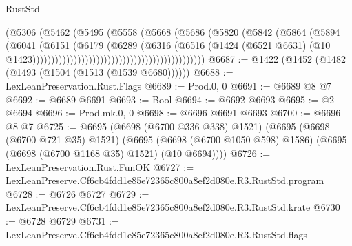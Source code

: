 \begin{lexlean}{RustStd}
\begin{coremodule}
                                                            (@5306
                                                              (@5462
                                                                (@5495
                                                                  (@5558
                                                                    (@5668
                                                                      (@5686
                                                                        (@5820
                                                                          (@5842
                                                                            (@5864
                                                                              (@5894
                                                                                (@6041
                                                                                  (@6151
                                                                                    (@6179
                                                                                      (@6289
                                                                                        (@6316
                                                                                          (@6516
                                                                                            (@1424
                                                                                              (@6521
                                                                                                @6631)
                                                                                              (@10
                                                                                                @1423))))))))))))))))))))))))))))))))))))))))))))))
@6687 := @1422 (@1452 (@1482 (@1493 (@1504 (@1513 (@1539 @6680))))))
@6688 := LexLeanPreservation.Rust.Flags
@6689 := Prod.{0, 0}
@6691 := @6689 @8 @7
@6692 := @6689 @6691
@6693 := Bool
@6694 := @6692 @6693
@6695 := @2 @6694
@6696 := Prod.mk.{0, 0}
@6698 := @6696 @6691 @6693
@6700 := @6696 @8 @7
@6725 := @6695
    (@6698 (@6700 @336 @338) @1521)
    (@6695
      (@6698 (@6700 @721 @35) @1521)
      (@6695 (@6698 (@6700 @1050 @598) @1586) (@6695 (@6698 (@6700 @1168 @35) @1521) (@10 @6694))))
@6726 := LexLeanPreservation.Rust.FunOK
@6727 := LexLeanPreserve.Cf6cb4fdd1e85e72365c800a8ef2d080e.R3.RustStd.program
@6728 := @6726 @6727
@6729 := LexLeanPreserve.Cf6cb4fdd1e85e72365c800a8ef2d080e.R3.RustStd.krate
@6730 := @6728 @6729
@6731 := LexLeanPreserve.Cf6cb4fdd1e85e72365c800a8ef2d080e.R3.RustStd.flags

\end{coremodule}
\end{lexlean}
